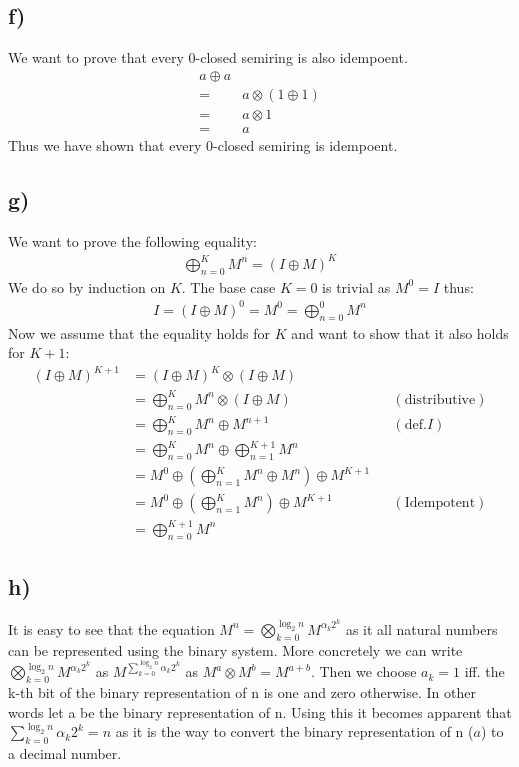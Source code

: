 \documentclass[a4paper,12pt]{ETHexercise}
\begin{document}
\subsection*{f)}
We want to prove that every 0-closed semiring is also idempoent.
\begin{align}
    a \oplus a\\
    = &a \otimes (1 \oplus 1)\\
    = &a \otimes 1\\
    = &a
\end{align}
Thus we have shown that every 0-closed semiring is idempoent.

\subsection*{g)}
We want to prove the following equality:
\begin{align*}
    \bigoplus_{n=0}^{K} M^n = (I \oplus M)^K
\end{align*}
We do so by induction on $K$.
The base case $K = 0$ is trivial as $M^0 = I$ thus:
\begin{align}
    I = (I \oplus M)^0 = M^0 = \bigoplus_{n=0}^{0} M^n
\end{align}
Now we assume that the equality holds for $K$ and want to show that it also holds for $K+1$:
\begin{align}
    (I \oplus M)^{K+1} &= (I \oplus M)^K \otimes (I \oplus M) \\
    &=  \bigoplus_{n=0}^{K} M^n \otimes (I \oplus M) &&(\text{distributive})\\
    &=  \bigoplus_{n=0}^{K} M^n \oplus M^{n+1} &&(\text{def.} I)\\
    &=  \bigoplus_{n=0}^{K} M^n \oplus \bigoplus_{n=1}^{K+1} M^{n} \\
    &=   M^0 \oplus \left(\bigoplus_{n=1}^{K} M^n \oplus M^{n}\right) \oplus M^{K+1} \\
    &=   M^0 \oplus \left(\bigoplus_{n=1}^{K} M^{n}\right) \oplus M^{K+1}&&(\text{Idempotent}) \\
    &=  \bigoplus_{n=0}^{K+1} M^n 
\end{align}

\subsection*{h)}
It is easy to see that the equation $M^n = \bigotimes^{\log_2n}_{k = 0} M^{\alpha_k 2^k}$ as it all natural numbers can be represented using the binary system.
More concretely we can write $\bigotimes^{\log_2n}_{k = 0} M^{\alpha_k 2^k}$ as $M^{\sum^{\log_2n}_{k = 0} \alpha_k 2^k}$ as $M^a \otimes M^b = M^{a + b}$. Then  we choose $a_k = 1 $ iff. the k-th bit of the binary representation of n is one and zero otherwise. In other words let a be the binary representation of n. Using this it becomes apparent that $\sum^{\log_2n}_{k = 0} \alpha_k 2^k = n$ as it is the way to convert the binary representation of n ($a$) to a decimal number.
\end{document}
